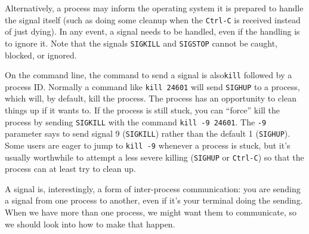 Alternatively, a process may inform the operating system it is prepared to handle the signal itself (such as doing some cleanup when the \texttt{Ctrl-C} is received instead of just dying). In any event, a signal needs to be handled, even if the handling is to ignore it. Note that the signals \texttt{SIGKILL} and \texttt{SIGSTOP} cannot be caught, blocked, or ignored.

On the command line, the command to send a signal is also\texttt{kill} followed by a process ID. Normally a command like \texttt{kill 24601} will send \texttt{SIGHUP} to a process, which will, by default, kill the process. The process has an opportunity to clean things up if it wants to. If the process is still stuck, you can ``force'' kill the process by sending \texttt{SIGKILL} with the command \texttt{kill -9 24601}. The \texttt{-9} parameter says to send signal 9 (\texttt{SIGKILL}) rather than the default 1 (\texttt{SIGHUP}). Some users are eager to jump to \texttt{kill -9} whenever a process is stuck, but it's usually worthwhile to attempt a less severe killing (\texttt{SIGHUP} or \texttt{Ctrl-C}) so that the process can at least try to clean up.


A signal is, interestingly, a form of inter-process communication: you are sending a signal from one process to another, even if it's your terminal doing the sending. When we have more than one process, we might want them to communicate, so we should look into how to make that happen.




